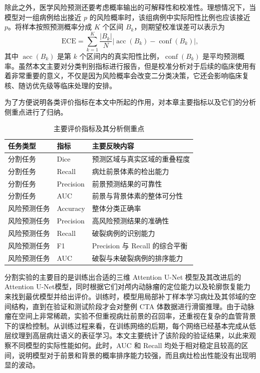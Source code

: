 除此之外，医学风险预测还要考虑概率输出的可解释性和校准性。理想情况下，当模型对一组病例给出接近 $p$ 的风险概率时，该组病例中实际阳性比例也应该接近 $p$。将样本按照预测概率分成 $K$ 个区间 $B_k$，则期望校准误差可以表示为
\begin{equation}
\mathrm{ECE}=\sum_{k=1}^{K}\frac{|B_k|}{N}\left|\operatorname{acc}(B_k)-\operatorname{conf}(B_k)\right|,
\label{eq:ece}
\end{equation}
其中 $\operatorname{acc}(B_k)$ 是第 $k$ 个区间内的真实阳性比例，$\operatorname{conf}(B_k)$ 是平均预测概率。虽然本文主要对分类判别指标进行报告，但是校准分析对于后续的临床使用有着非常重要的意义，不仅是因为风险概率会改变二分类决策，它还会影响临床复核、随访优先级等临床处理的安排。

为了方便说明各类评价指标在本文中所起的作用，对本章主要指标以及它们的分析侧重点进行了归纳。

\begin{table}[!htbp]
\centering
\caption{主要评价指标及其分析侧重点}
\label{tab:metric_summary}
\small
\renewcommand{\arraystretch}{0.88}
\begin{tabular}{lll}
\toprule
任务类型 & 指标 & 主要反映内容 \\
\midrule
分割任务 & Dice & 预测区域与真实区域的重叠程度 \\
分割任务 & Recall & 病灶前景体素的检出能力 \\
分割任务 & Precision & 前景预测结果的可靠性 \\
分割任务 & AUC & 前景与背景体素的整体可分性 \\
风险预测任务 & Accuracy & 整体分类正确率 \\
风险预测任务 & Precision & 高风险预测结果的准确性 \\
风险预测任务 & Recall & 破裂病例的识别能力 \\
风险预测任务 & F1 & Precision 与 Recall 的综合平衡 \\
风险预测任务 & AUC & 破裂与未破裂病例的排序能力 \\
\bottomrule
\end{tabular}
\normalsize
\renewcommand{\arraystretch}{1}
\end{table}


分割实验的主要目的是训练出合适的三维 Attention U-Net 模型及其改进后的 Attention U-Net模型，同时根据它们对颅内动脉瘤的定位能力以及轮廓恢复能力来找到最优模型并给出评价。训练时，模型用局部补丁样本学习病灶及其邻域的空间结构，直到在验证和测试阶段才会对整例 CTA 体数据进行滑窗推理。由于动脉瘤在空间上非常稀疏，实验不但重视病灶前景的召回率，还重视在复杂的血管背景下的误检控制。从训练过程来看，在训练网络的后期，每个网络已经基本完成从低层纹理到高层病灶语义的表征学习。本文主要统计了该阶段的验证结果，以此来观察不同模型的实际性能如何。此时，AUC 和 Recall 均处于相对稳定且较高的区间，说明模型对于前景和背景的概率排序能力较强，而且病灶检出性能没有出现明显的波动。


